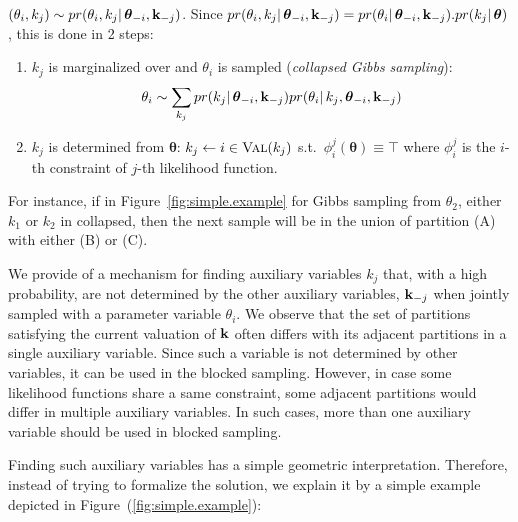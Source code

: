 $
(\theta_i, k_j) \sim pr(\theta_i, k_j | \, \boldsymbol \theta_{-i}, \textbf{k}_{-j})  
$.
Since 
$pr(\theta_i, k_j | \, \boldsymbol \theta_{-i}, \textbf{k}_{-j}) = 
pr(\theta_i | \, \boldsymbol \theta_{-i}, \textbf{k}_{-j}).pr(k_j | \, \boldsymbol\theta)$,  
this is done in 2 steps:
\begin{enumerate}
\item 
$k_j$ is marginalized over and $\theta_i$ is sampled (\emph{collapsed Gibbs sampling}):
$$
\theta_i \sim \sum_{k_j} 
pr(k_j | \, \boldsymbol \theta_{-i}, \textbf{k}_{-j}) 
pr(\theta_i | \, k_j, \boldsymbol \theta_{-i}, \textbf{k}_{-j})  
$$
\item
$k_j$ is determined from $\boldsymbol \theta$:
$k_j \leftarrow i \in \textsc{Val}(k_j)$ s.t.\ $\phi_i^j(\boldsymbol \theta) \equiv \top$
where $\phi_i^j$ is the $i$-th constraint of $j$-th likelihood function.
\end{enumerate}

For instance, if in Figure~\ref{fig:simple.example} for Gibbs sampling from $\theta_2$, either $k_1$ or $k_2$ in collapsed,
then the next sample will be in the union of partition (A) with either (B) or (C). 

We provide of a mechanism for finding auxiliary variables $k_j$ that, with a high  probability, are not determined by the other auxiliary variables, $\textbf{k}_{-j}$ when jointly sampled with a parameter variable $\theta_i$. 
We observe that the set of partitions satisfying the current valuation of $\textbf{k}$
often differs with its adjacent partitions in a single auxiliary variable.
Since such a variable is not determined by other variables, it can be used in the blocked sampling.
However, in case some likelihood functions share a same constraint, some adjacent partitions would differ in multiple auxiliary variables.
In such cases, more than one auxiliary variable should be used in blocked sampling.

Finding such auxiliary variables has a simple geometric interpretation. Therefore, instead of trying to formalize the solution, we explain it by a simple example depicted in Figure~(\ref{fig:simple.example}): 

